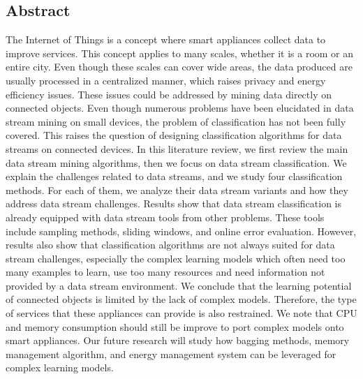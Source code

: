 \begin{center}
\section*{Abstract}
\begin{minipage}{0.9\textwidth}
The Internet of Things is a concept where smart
appliances collect data to improve services.
This concept applies to many scales, whether
it is a room or an entire city. Even though
these scales can cover wide areas,
the data produced are usually processed in a
centralized manner, which raises privacy and
energy efficiency issues.  These issues could
be addressed by mining data directly on
connected objects.  Even though numerous
problems have been elucidated in data stream
mining on small devices, the problem of
classification has not been fully covered.
This raises the question of designing
classification algorithms for data streams on
connected devices.
In this literature review, we first review the
main data stream mining algorithms, then we focus
on data stream classification.  We explain the
challenges related to data streams, and we study four
classification methods. For each of them, we
analyze their data stream variants and how they
address data stream challenges.
Results show that data stream classification is
already equipped with data stream tools from other
problems. These tools include sampling
methods, sliding windows, and online error
evaluation.  However, results also show that
classification algorithms are not always suited for data
stream challenges, especially the complex
learning models which often need too many
examples to learn, use too many resources and need
information not provided by a data stream
environment. 
We conclude that the learning potential of
connected objects is limited by the lack of
complex models. Therefore, the type of
services that these appliances can provide is
also restrained. We note that CPU and memory
consumption should still be improve to port
complex models onto smart appliances.  Our
future research will study how bagging
methods, memory management algorithm, and
energy management system can be leveraged for
complex learning models.
\end{minipage}
\end{center}


